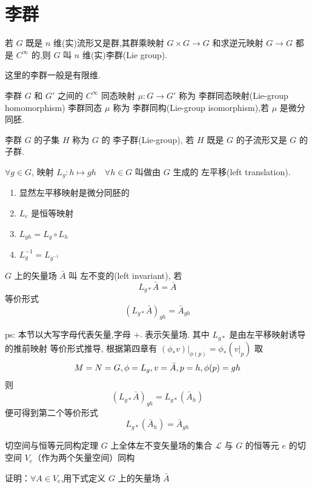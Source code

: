 \documentclass[../main.tex]{subfiles}
\begin{document}
\chapter{李群}
\begin{definition}
    若 $G$ 既是 $n$ 维(实)流形又是群,其群乘映射 $G\times G\rightarrow G$ 和求逆元映射 $G\rightarrow G$ 都是 $C^\infty$ 的,则 $G$ 叫 $n$ 维(实)李群(Lie group).
\end{definition}
    这里的李群一般是有限维.
\begin{definition}
    李群 $G$ 和 $G'$ 之间的 $C^\infty$ 同态映射 $\mu : G\rightarrow G'$ 称为 李群同态映射(Lie-group homomorphism) 李群同态 $\mu$ 称为 李群同构(Lie-group isomorphism),若 $\mu$ 是微分同胚.
\end{definition}
\begin{definition}
    李群 $G$ 的子集 $H$ 称为 $G$ 的 李子群(Lie-group), 若 $H$ 既是 $G$ 的子流形又是 $G$ 的子群.
\end{definition}
\begin{definition}
     $\forall g \in G$, 映射 $L_g : h \mapsto gh \quad \forall h \in G$ 叫做由 $G$ 生成的 左平移(left translation).
\end{definition}
\begin{enumerate}
    \item 显然左平移映射是微分同胚的
    \item $L_e$ 是恒等映射
    \item $L_{gh} = L_g \circ L_h$
    \item $L_g^{-1} = L_{g^{-1}}$
\end{enumerate}
\begin{definition}
     $G$ 上的矢量场 $\bar{A}$ 叫 左不变的(left invariant), 若
    $$
    L_{g*} \bar{A} = \bar{A}
    $$
    等价形式
    $$
    (L_{g*}\bar{A})_{gh} = \bar{A}_{gh}
    $$
\end{definition}
ps: 本节以大写字母代表矢量,字母 $+\bar{}$ 表示矢量场.
其中 $L_{g*}$ 是由左平移映射诱导的推前映射
等价形式推导, 根据第四章有 $(\phi_*v)|_{\phi(p)} = \phi_*(v|_p)$
取
    $$
    M = N = G,\phi = L_g, v = \bar{A}, p = h, \phi(p) = gh\\
    $$
则
 $$ (L_{g *}\bar{A})_{gh} = L_{g*}(\bar{A}_h) $$
便可得到第二个等价形式
$$ L_{g*}(\bar{A}_h) =\bar{A}_{gh} $$
\begin{theorem}{}{切空间与恒等元同构定理}
    $G$ 上全体左不变矢量场的集合 $\mathscr{L}$ 与 $G$ 的恒等元 $e$ 的切空间 $V_e$（作为两个矢量空间）同构
\end{theorem}
证明：$\forall A \in V_e$,用下式定义 $G$ 上的矢量场 $\bar{A}$
\end{document}
